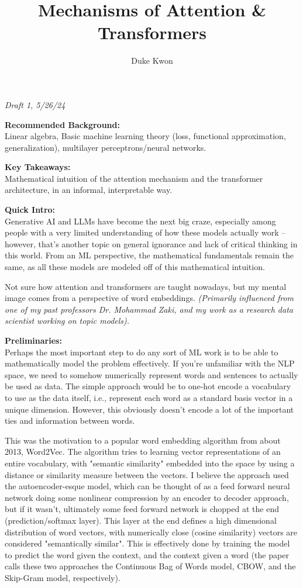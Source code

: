 \documentclass[11pt]{article}
\title{Mechanisms of Attention \& Transformers}
\author{Duke Kwon}
\begin{document}
    
    \maketitle

\textit{Draft 1, 5/26/24}

\textbf{Recommended Background:}\\
Linear algebra, Basic machine learning theory (loss, functional approximation, generalization), multilayer perceptrons/neural networks.

\textbf{Key Takeaways:}\\
Mathematical intuition of the attention mechanism and the transformer architecture, in an informal, interpretable way.

\textbf{Quick Intro:}\\
Generative AI and LLMs have become the next big craze, especially among people with a very limited understanding of how these models actually work -- however, that's another topic on general ignorance and lack of critical thinking in this world. From an ML perspective, the mathematical fundamentals remain the same, as all these models are modeled off of this mathematical intuition.

Not sure how attention and transformers are taught nowadays, but my mental image comes from a perspective of word embeddings. \textit{(Primarily influenced from one of my past professors Dr. Mohammad Zaki, and my work as a research data scientist working on topic models).}

\textbf{Preliminaries:}\\
Perhaps the most important step to do any sort of ML work is to be able to mathematically model the problem effectively. If you're unfamiliar with the NLP space, we need to somehow numerically represent words and sentences to actually be used as data. The simple approach would be to one-hot encode a vocabulary to use as the data itself, i.e., represent each word as a standard basis vector in a unique dimension. However, this obviously doesn't encode a lot of the important ties and information between words.

This was the motivation to a popular word embedding algorithm from about 2013, Word2Vec. The algorithm tries to learning vector representations of an entire vocabulary, with "semantic similarity" embedded into the space by using a distance or similarity measure between the vectors. I believe the approach used the autoencoder-esque model, which can be thought of as a feed forward neural network doing some nonlinear compression by an encoder to decoder approach, but if it wasn't, ultimately some feed forward network is chopped at the end (prediction/softmax layer). This layer at the end defines a high dimensional distribution of word vectors, with numerically close (cosine similarity) vectors are considered "semantically similar". This is effectively done by training the model to predict the word given the context, and the context given a word (the paper calls these two approaches the Continuous Bag of Words model, CBOW, and the Skip-Gram model, respectively).
\end{document}

